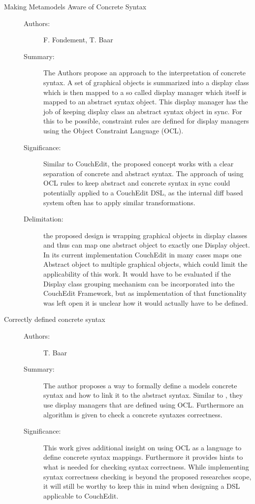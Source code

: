 \documentclass[10pt,a4paper,oneside]{scrartcl}
\begin{document}
\begin{description}
  \item[Making Metamodels Aware of Concrete Syntax] \cite{hutchison_making_2005}
        \begin{description}
          \item[Authors:] F. Fondement, T. Baar
          \item[Summary:] The Authors propose an approach to the interpretation of concrete syntax. A set of graphical objects is summarized into a display class which is then mapped to a so called display manager which itself is mapped to an abstract syntax object. This display manager has the job of keeping display class an abstract syntax object in sync. For this to be possible, constraint rules are defined for display managers using the Object Constraint Language (OCL).
          \item[Significance:] Similar to CouchEdit, the proposed concept works with a clear separation of concrete and abstract syntax. The approach of using OCL rules to keep abstract and concrete syntax in sync could potentially applied to a CouchEdit DSL, as the internal diff based system often has to apply similar transformations.
          \item[Delimitation:] the proposed design is wrapping graphical objects in display classes and thus can map one abstract object to exactly one Display object. In its current implementation CouchEdit in many cases maps one Abstract object to multiple graphical objects, which could limit the applicability of this work. It would have to be evaluated if the Display class grouping mechanism can be incorporated into the CouchEdit Framework, but as implementation of that functionality was left open it is unclear how it would actually have to be defined.
        \end{description}

  \item[Correctly defined concrete syntax] \cite{baar_correctly_2008}
        \begin{description}
          \item[Authors:] T. Baar
          \item[Summary:] The author proposes a way to formally define a models concrete syntax and how to link it to the abstract syntax. Similar to \cite{hutchison_making_2005}, they use display managers that are defined using OCL. Furthermore an algorithm is given to check a concrete syntaxes correctness.
          \item[Significance:] This work gives additional insight on using OCL as a language to define concrete syntax mappings. Furthermore it provides hints to what is needed for checking syntax correctness. While implementing syntax correctness checking is beyond the proposed researches scope, it will still be worthy to keep this in mind when designing a DSL applicable to CouchEdit.
        \end{description}


\end{description}
\end{document}
